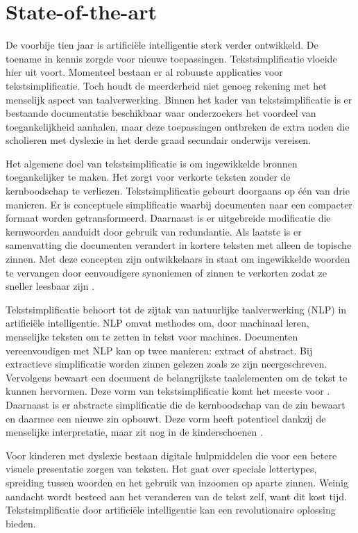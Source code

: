 \section{State-of-the-art}%
\label{sec:state-of-the-art}

De voorbije tien jaar is artificiële intelligentie sterk verder ontwikkeld. De toename in kennis zorgde voor nieuwe toepassingen. Tekstsimplificatie vloeide hier uit voort. Momenteel bestaan er al robuuste applicaties voor tekstsimplificatie. Toch houdt de meerderheid niet genoeg rekening met het menselijk aspect van taalverwerking. Binnen het kader van tekstsimplificatie is er bestaande documentatie beschikbaar waar onderzoekers het voordeel van toegankelijkheid aanhalen, maar deze toepassingen ontbreken de extra noden die scholieren met dyslexie in het derde graad secundair onderwijs vereisen.

Het algemene doel van tekstsimplificatie is om ingewikkelde bronnen toegankelijker te maken. Het zorgt voor verkorte teksten zonder de kernboodschap te verliezen. Tekstsimplificatie gebeurt doorgaans op één van drie manieren. Er is conceptuele simplificatie waarbij documenten naar een compacter formaat worden getransformeerd. Daarnaast is er uitgebreide modificatie die kernwoorden aanduidt door gebruik van redundantie. Als laatste is er samenvatting die documenten verandert in kortere teksten met alleen de topische zinnen. Met deze concepten zijn ontwikkelaars in staat om ingewikkelde woorden te vervangen door eenvoudigere synoniemen of zinnen te verkorten zodat ze sneller leesbaar zijn \autocite{Siddharthan2014}.

Tekstsimplificatie behoort tot de zijtak van natuurlijke taalverwerking (NLP) in artificiële intelligentie. NLP omvat methodes om, door machinaal leren, menselijke teksten om te zetten in tekst voor machines. Documenten vereenvoudigen met NLP kan op twee manieren: extract of abstract. Bij extractieve simplificatie worden zinnen gelezen zoals ze zijn neergeschreven. Vervolgens bewaart een document de belangrijkste taalelementen om de tekst te kunnen hervormen. Deze vorm van tekstsimplificatie komt het meeste voor \autocite{Sciforce2020}. Daarnaast is er abstracte simplificatie die de kernboodschap van de zin bewaart en daarmee een nieuwe zin opbouwt. Deze vorm heeft potentieel dankzij de menselijke interpretatie, maar zit nog in de kinderschoenen \autocite{Chowdhary2020}.

Voor kinderen met dyslexie bestaan digitale hulpmiddelen die voor een betere visuele presentatie zorgen van teksten. Het gaat over speciale lettertypes, spreiding tussen woorden en het gebruik van inzoomen op aparte zinnen. Weinig aandacht wordt besteed aan het veranderen van de tekst zelf, want dit kost tijd. Tekstsimplificatie door artificiële intelligentie kan een revolutionaire oplossing bieden. 

